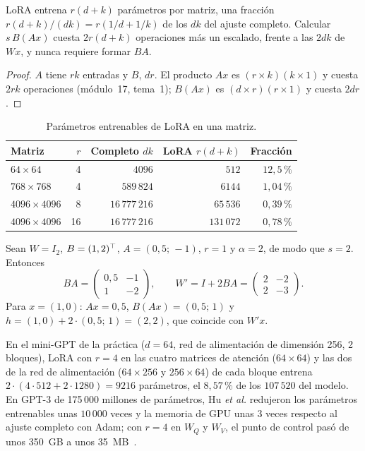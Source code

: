 \begin{proposicion}\label{prop:lora-param}
LoRA entrena $r(d+k)$ parámetros por matriz, una fracción $r(d+k)/(dk)=r(1/d+1/k)$ de los $dk$ del ajuste completo. Calcular $s\,B(Ax)$ cuesta $2r(d+k)$ operaciones más un escalado, frente a las $2dk$ de $Wx$, y nunca requiere formar $BA$.
\end{proposicion}

\begin{proof}
$A$ tiene $rk$ entradas y $B$, $dr$. El producto $Ax$ es $(r\times k)(k\times 1)$ y cuesta $2rk$ operaciones (módulo~17, tema~1); $B(Ax)$ es $(d\times r)(r\times 1)$ y cuesta $2dr$.
\end{proof}

\begin{table}[h]
\centering\small
\caption{Parámetros entrenables de LoRA en una matriz.}\label{tab:lora}
\begin{tabular}{@{}lrrrr@{}}
\toprule
Matriz & $r$ & Completo $dk$ & LoRA $r(d+k)$ & Fracción \\
\midrule
$64\times 64$ & 4 & $4096$ & $512$ & $12{,}5\,\%$ \\
$768\times 768$ & 4 & $589\,824$ & $6144$ & $1{,}04\,\%$ \\
$4096\times 4096$ & 8 & $16\,777\,216$ & $65\,536$ & $0{,}39\,\%$ \\
$4096\times 4096$ & 16 & $16\,777\,216$ & $131\,072$ & $0{,}78\,\%$ \\
\bottomrule
\end{tabular}
\end{table}

\begin{ejemplo}\label{ej:lora-mano}
Sean $W=I_2$, $B=(1,2)^{\top}$, $A=(0{,}5;\,-1)$, $r=1$ y $\alpha=2$, de modo que $s=2$. Entonces
\[
BA=\begin{pmatrix}0{,}5&-1\\1&-2\end{pmatrix},\qquad W'=I+2BA=\begin{pmatrix}2&-2\\2&-3\end{pmatrix}.
\]
Para $x=(1,0)$: $Ax=0{,}5$, $B(Ax)=(0{,}5;\,1)$ y $h=(1,0)+2\cdot(0{,}5;\,1)=(2,2)$, que coincide con $W'x$.
\end{ejemplo}

En el mini-GPT de la práctica ($d=64$, red de alimentación de dimensión 256, 2 bloques), LoRA con $r=4$ en las cuatro matrices de atención ($64\times 64$) y las dos de la red de alimentación ($64\times 256$ y $256\times 64$) de cada bloque entrena $2\cdot(4\cdot 512+2\cdot 1280)=9216$ parámetros, el $8{,}57\,\%$ de los $107\,520$ del modelo. En GPT-3 de 175\,000 millones de parámetros, Hu \emph{et al.} redujeron los parámetros entrenables unas $10\,000$ veces y la memoria de GPU unas 3 veces respecto al ajuste completo con Adam; con $r=4$ en $W_Q$ y $W_V$, el punto de control pasó de unos 350~GB a unos 35~MB~\cite[§4.2]{hu-lora}.

